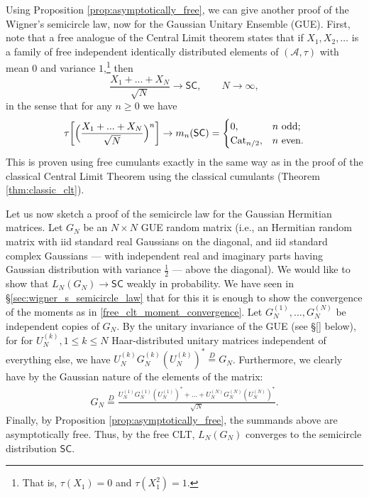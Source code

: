 \documentclass[letterpaper,11pt,oneside,reqno]{amsart}
\numberwithin{equation}{section}
\newcommand{\SC}{\mathsf{SC}}
\theoremstyle{definition}
\begin{document}
Using Proposition \ref{prop:asymptotically_free}, we can give another proof of the 
Wigner's semicircle law, now for the Gaussian Unitary Ensemble (GUE).
First, note that a free analogue of the Central Limit theorem
states that if $X_1,X_2,\ldots$ is a family of free independent 
identically distributed elements of $(\mathcal{A},\tau)$
with mean $0$ and variance $1$,\footnote{That is,
$\tau(X_1)=0$ and $\tau(X_1^{2})=1$.} then
\begin{equation*}
	\frac{X_1+...+X_N}{\sqrt{N}}\to \SC,\qquad N\to\infty,
\end{equation*}
in the sense that for any $n\ge0$ we have
\begin{equation}\label{free_clt_moment_convergence}
	\tau\bigg[\Big(\frac{X_1+...+X_N}{\sqrt{N}}\Big)^{n}\bigg]\to m_n(\SC)=
	\begin{cases}
		0,&\textnormal{$n$ odd};\\
		\mathrm{Cat}_{n/2},
		&\textnormal{$n$ even}.
	\end{cases}
\end{equation}
This is proven using free cumulants exactly in the same way as in
the proof of the classical Central Limit Theorem using the classical
cumulants (Theorem \ref{thm:classic_clt}).
	
Let us now sketch a proof of the semicircle law for the Gaussian Hermitian matrices.
Let $G_N$ be an $N\times N$ GUE random matrix (i.e., an Hermitian random
matrix with iid standard real Gaussians on the diagonal, 
and iid standard complex Gaussians --- with independent
real and imaginary parts having Gaussian distribution with variance $\frac 12$
--- above the diagonal). We would like to show that
$L_N(G_N)\to\SC$ weakly in probability. We have seen in \S \ref{sec:wigner_s_semicircle_law} that
for this it is enough to show the convergence of the moments as in \eqref{free_clt_moment_convergence}.
Let $G_N^{(1)},...,G_N^{(N)}$ be independent copies of $G_N$.
By the unitary invariance of the GUE (see \S \ref{} below), for 
for $U_N^{(k)}, 1\leq k\leq N$ Haar-distributed unitary matrices independent of everything else, we have 
$U_N^{(k)}G_N^{(k)}(U_N^{(k)})^*\stackrel{D}{=} G_N$.
Furthermore, we clearly have by the Gaussian nature of the elements of the matrix:
\begin{align*}
    G_N\stackrel{D}{=}\frac{U_N^{(1)}G_N^{(1)}(U^{(1)}_N)^*+...+U_N^{(N)}G_N^{(N)}(U_N^{(N)})^*}{\sqrt{N}}.
\end{align*}
Finally, by Proposition \ref{prop:asymptotically_free},
the summands above are asymptotically free. Thus, by the free CLT,
$L_N(G_N)$ converges to the semicircle distribution $\SC$. 
\end{document}
